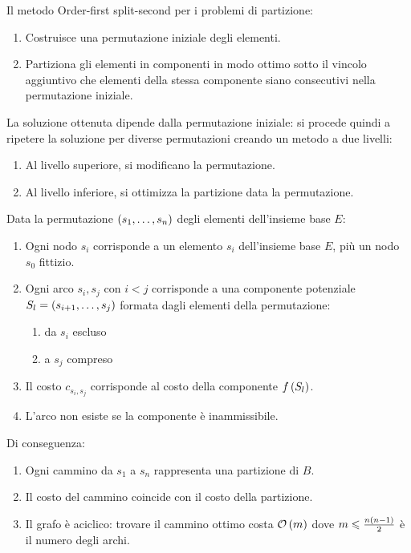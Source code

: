 \documentclass[\main/main.tex]{subfiles}
\begin{document}
\begin{definition}
    Il metodo Order-first split-second per i problemi di partizione:
    \begin{enumerate}
        \item Costruisce una permutazione iniziale degli elementi.
        \item Partiziona gli elementi in componenti in modo ottimo sotto il vincolo aggiuntivo che elementi della stessa componente siano consecutivi nella permutazione iniziale.
    \end{enumerate}
    La soluzione ottenuta  dipende dalla permutazione iniziale: si procede quindi a ripetere la soluzione per diverse permutazioni creando un metodo a due livelli:
\begin{enumerate}
    \item Al livello superiore, si modificano la permutazione.
    \item Al livello inferiore, si ottimizza la partizione data la permutazione.
\end{enumerate}
\end{definition}
\begin{observation}
    Data la permutazione \(\left(s_1, \ldots, s_n\right)\) degli elementi dell'insieme base \(E\):
    \begin{enumerate}
        \item Ogni nodo \(s_i\) corrisponde a un elemento \(s_i\) dell'insieme base \(E\), più un nodo \(s_0\) fittizio.
        \item Ogni arco \(s_i, s_j\) con \(i < j\) corrisponde a una componente potenziale \(S_l = \left(s_{i+1}, \ldots, s_j\right)\) formata dagli elementi della permutazione:
        \begin{enumerate}
            \item da \(s_i\) escluso
            \item a \(s_j\) compreso
        \end{enumerate}
        \item Il costo \(c_{s_i, s_j}\) corrisponde al costo della componente \(f\left(S_l\right)\).
        \item L'arco non esiste se la componente è inammissibile.
    \end{enumerate}
    
    Di conseguenza:
    \begin{enumerate}
        \item Ogni cammino da \(s_1\) a \(s_n\) rappresenta una partizione di \(B\).
        \item Il costo del cammino coincide con il costo della partizione.
        \item Il grafo è aciclico: trovare il cammino ottimo costa \(\mathcal{O}\left(m\right)\) dove \(m \leqslant \frac{n\left(n-1\right)}{2}\) è il numero degli archi.
    \end{enumerate}
\end{observation}
\end{document}
